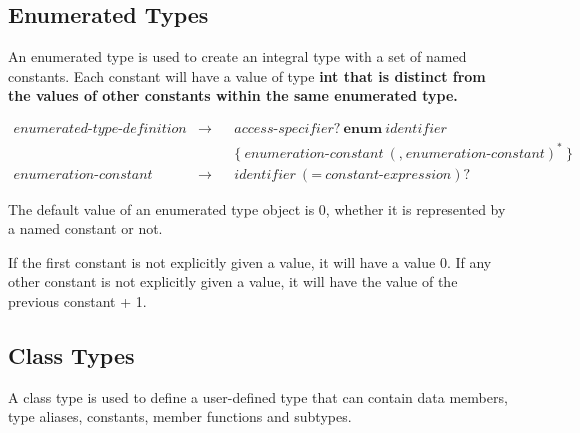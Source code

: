 \documentclass[a4paper,oneside,11pt]{article}
\begin{document}
\subsection{Enumerated Types}\label{sec:enumerations}\label{enumeratedtypedefinition}

An enumerated type is used to create an integral type with a set of named constants.
Each constant will have a value of type \bf{int} that is distinct
from the values of other constants within the same enumerated type.

\begin{align*}
enumerated\textrm{-}type\textrm{-}definition &\rightarrow & &\hyperref[accessspecifier]{access\textrm{-}specifier}? \> \textbf{enum} \>
\hyperref[identifier]{identifier}\\
& & &\texttt{\{} \> enumeration\textrm{-}constant \> (\texttt{,} \> enumeration\textrm{-}constant)^* \> \texttt{\}}\\
enumeration\textrm{-}constant &\rightarrow & &\hyperref[identifier]{identifier} \> (\texttt{=} \> \hyperref[constantexpr]{constant\textrm{-}expression})?
\end{align*}

The default value of an enumerated type object is 0, whether it is represented by a named constant or not.

If the first constant is not explicitly given a value, it will have a value 0.
If any other constant is not explicitly given a value, it will have the value of the previous constant + 1.

\subsection{Class Types}\label{sec:classtypes}\label{classdefinition}

A class type is used to define a user-defined type that can contain data members, type aliases, constants, member functions and subtypes.
\end{document}
